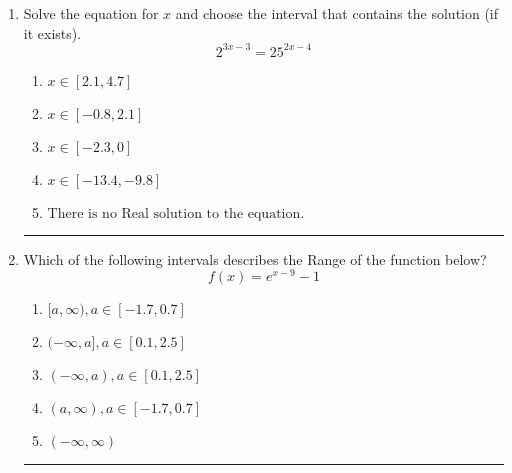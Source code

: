 \documentclass[14pt]{extbook}
\newcommand{\litem}[1]{\item#1\hspace*{-1cm}\rule{\textwidth}{0.4pt}}
\begin{document}
\begin{enumerate}
{\begin{enumerate}[label=\Alph*.]
\end{enumerate} }
\litem{
Solve the equation for $x$ and choose the interval that contains the solution (if it exists).\[ 2^{3x-3} = 25^{2x-4} \]\begin{enumerate}[label=\Alph*.]
\item \( x \in [2.1, 4.7] \)
\item \( x \in [-0.8, 2.1] \)
\item \( x \in [-2.3, 0] \)
\item \( x \in [-13.4, -9.8] \)
\item \( \text{There is no Real solution to the equation.} \)

\end{enumerate} }
\litem{
Which of the following intervals describes the Range of the function below?\[ f(x) = e^{x-9}-1 \]\begin{enumerate}[label=\Alph*.]
\item \( [a, \infty), a \in [-1.7, 0.7] \)
\item \( (-\infty, a], a \in [0.1, 2.5] \)
\item \( (-\infty, a), a \in [0.1, 2.5] \)
\item \( (a, \infty), a \in [-1.7, 0.7] \)
\item \( (-\infty, \infty) \)

\end{enumerate} }
\end{enumerate}
\end{document}
